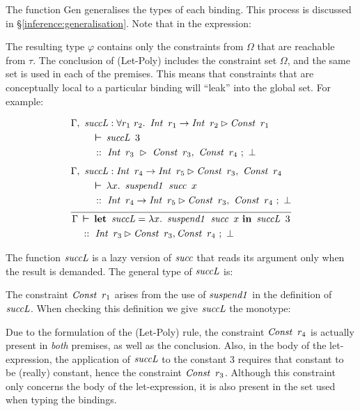 The function Gen generalises the types of each binding. This process is discussed in \S\ref{inference:generalisation}. Note that in the expression:

\code{
	$\varphi = \rGen(\Gamma, \ \tau \ \rhd \Omega)$
}

The resulting type $\varphi$ contains only the constraints from $\Omega$ that are reachable from $\tau$. The conclusion of (Let-Poly) includes the constraint set $\Omega$, and the same set is used in each of the premises. This means that constraints that are conceptually local to a particular binding will ``leak'' into the global set. For example:

$$
	\frac	
	{\begin{aligned}
	 & \Gamma, \ \isuccL : \forall r_1 \ r_2. \ \iInt \ r_1 \to \iInt \ r_2 \rhd \iConst \ r_1 \\
	 & \qq \judge \isuccL \ 3 \\
	 & \qq \ :: \ \iInt \ r_3 \ \rhd \  \iConst \ r_3, \ \iConst \ r_4 \ ; \ \bot
	 \\[1ex]
         & \Gamma, \ \isuccL : \iInt \ r_4 \to \iInt \ r_5 \rhd \iConst \ r_3, \ \iConst \ r_4 \\
	 & \qq \judge \lambda x. \ \isuspendOne \ \isucc \ x  \\
	 & \qq \ :: \ \iInt \ r_4 \to \iInt \ r_5 \rhd \iConst \ r_3, \ \iConst \ r_4 \ ; \ \bot \\[1ex]
	 \end{aligned}
	}
	{\begin{aligned}
	 \Gamma & \judge \klet \ \isuccL = \lambda x. \ \isuspendOne \ \isucc \ 
x \ \kin \ \isuccL \ 3 \\
	 & \ :: \ \iInt \ r_3 \rhd \iConst \ r_3, \iConst \ r_4 \ ; \ \bot
	 \end{aligned}
	}
$$

The function $\operatorname{\mathit{succL}}$ is a lazy version of $\operatorname{\mathit{succ}}$ that reads its argument only when the result is demanded. The general type of $\operatorname{\mathit{succL}}$ is:

\code{
	$\isuccL :: \forall r_1 \ r_2. \ \iInt \ r_1 \to \iInt \ r_2 \rhd \iConst \ r_1$
} 

The constraint $\operatorname{\mathit{Const}} \ r_1$ arises from the use of $\operatorname{\mathit{suspend1}}$ in the definition of $\operatorname{\mathit{succL}}$. When checking this definition we give $\operatorname{\mathit{succL}}$ the monotype:


Due to the formulation of the (Let-Poly) rule, the constraint $\operatorname{\mathit{Const}} \ r_4$ is actually present in \emph{both} premises, as well as the conclusion. Also, in the body of the let-expression, the application of $\operatorname{\mathit{succL}}$ to the constant $3$ requires that constant to be (really) constant, hence the constraint $\operatorname{\mathit{Const}} \ r_3$. Although this constraint only concerns the body of the let-expression, it is also present in the set used when typing the bindings.

